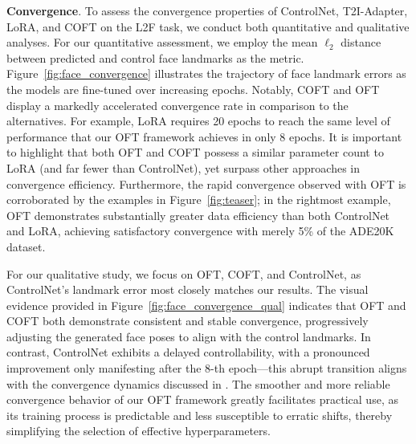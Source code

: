 \textbf{Convergence}. To assess the convergence properties of ControlNet, T2I-Adapter, LoRA, and COFT on the L2F task, we conduct both quantitative and qualitative analyses. For our quantitative assessment, we employ the mean $\ell_2$ distance between predicted and control face landmarks as the metric. Figure~\ref{fig:face_convergence} illustrates the trajectory of face landmark errors as the models are fine-tuned over increasing epochs. Notably, COFT and OFT display a markedly accelerated convergence rate in comparison to the alternatives. For example, LoRA requires 20 epochs to reach the same level of performance that our OFT framework achieves in only 8 epochs. It is important to highlight that both OFT and COFT possess a similar parameter count to LoRA (and far fewer than ControlNet), yet surpass other approaches in convergence efficiency. Furthermore, the rapid convergence observed with OFT is corroborated by the examples in Figure~\ref{fig:teaser}; in the rightmost example, OFT demonstrates substantially greater data efficiency than both ControlNet and LoRA, achieving satisfactory convergence with merely 5\% of the ADE20K dataset. 

For our qualitative study, we focus on OFT, COFT, and ControlNet, as ControlNet’s landmark error most closely matches our results. The visual evidence provided in Figure~\ref{fig:face_convergence_qual} indicates that OFT and COFT both demonstrate consistent and stable convergence, progressively adjusting the generated face poses to align with the control landmarks. In contrast, ControlNet exhibits a delayed controllability, with a pronounced improvement only manifesting after the 8-th epoch—this abrupt transition aligns with the convergence dynamics discussed in \cite{zhang2023adding}. The smoother and more reliable convergence behavior of our OFT framework greatly facilitates practical use, as its training process is predictable and less susceptible to erratic shifts, thereby simplifying the selection of effective hyperparameters.

